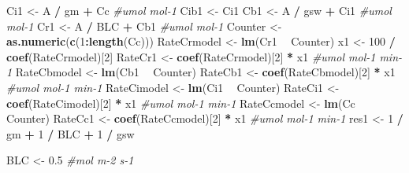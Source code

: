 \documentclass[
]{krantz}
\makeatletter
\newenvironment{Shaded}{\begin{snugshade}}{\end{snugshade}}
\newcommand{\CommentTok}[1]{\textcolor[rgb]{0.56,0.35,0.01}{\textit{#1}}}
\newcommand{\DecValTok}[1]{\textcolor[rgb]{0.00,0.00,0.81}{#1}}
\newcommand{\FloatTok}[1]{\textcolor[rgb]{0.00,0.00,0.81}{#1}}
\newcommand{\KeywordTok}[1]{\textcolor[rgb]{0.13,0.29,0.53}{\textbf{#1}}}
\newcommand{\NormalTok}[1]{#1}
\newcommand{\OperatorTok}[1]{\textcolor[rgb]{0.81,0.36,0.00}{\textbf{#1}}}
\newcommand{\StringTok}[1]{\textcolor[rgb]{0.31,0.60,0.02}{#1}}
\newenvironment{kframe}{%
\medskip{}
\setlength{\fboxsep}{.8em}
 \def\at@end@of@kframe{}%
 \ifinner\ifhmode%
  \def\at@end@of@kframe{\end{minipage}}%
  \begin{minipage}{\columnwidth}%
 \fi\fi%
 \def\FrameCommand##1{\hskip\@totalleftmargin \hskip-\fboxsep
 \colorbox{shadecolor}{##1}\hskip-\fboxsep
     \hskip-\linewidth \hskip-\@totalleftmargin \hskip\columnwidth}%
 \MakeFramed {\advance\hsize-\width
   \@totalleftmargin\z@ \linewidth\hsize
   \@setminipage}}%
 {\par\unskip\endMakeFramed%
 \at@end@of@kframe}
\renewenvironment{Shaded}{\begin{kframe}}{\end{kframe}}
\makeatother
\begin{document}
\begin{Shaded}
\begin{Highlighting}[]
\NormalTok{Ci1 <-}\StringTok{ }\NormalTok{A }\OperatorTok{/}\StringTok{ }\NormalTok{gm }\OperatorTok{+}\StringTok{ }\NormalTok{Cc }\CommentTok{#umol mol-1}
\NormalTok{Cib1 <-}\StringTok{ }\NormalTok{Ci1}
\NormalTok{Cb1 <-}\StringTok{ }\NormalTok{A }\OperatorTok{/}\StringTok{ }\NormalTok{gsw }\OperatorTok{+}\StringTok{ }\NormalTok{Ci1 }\CommentTok{#umol mol-1}
\NormalTok{Cr1 <-}\StringTok{ }\NormalTok{A }\OperatorTok{/}\StringTok{ }\NormalTok{BLC }\OperatorTok{+}\StringTok{ }\NormalTok{Cb1 }\CommentTok{#umol mol-1}
\NormalTok{Counter <-}\StringTok{ }\KeywordTok{as.numeric}\NormalTok{(}\KeywordTok{c}\NormalTok{(}\DecValTok{1}\OperatorTok{:}\KeywordTok{length}\NormalTok{(Cc)))}
\NormalTok{RateCrmodel <-}\StringTok{ }\KeywordTok{lm}\NormalTok{(Cr1 }\OperatorTok{~}\StringTok{ }\NormalTok{Counter)}
\NormalTok{x1 <-}\StringTok{ }\DecValTok{100} \OperatorTok{/}\StringTok{ }\KeywordTok{coef}\NormalTok{(RateCrmodel)[}\DecValTok{2}\NormalTok{]}
\NormalTok{RateCr1 <-}\StringTok{ }\KeywordTok{coef}\NormalTok{(RateCrmodel)[}\DecValTok{2}\NormalTok{] }\OperatorTok{*}\StringTok{ }\NormalTok{x1 }\CommentTok{#umol mol-1 min-1}
\NormalTok{RateCbmodel <-}\StringTok{ }\KeywordTok{lm}\NormalTok{(Cb1 }\OperatorTok{~}\StringTok{ }\NormalTok{Counter)}
\NormalTok{RateCb1 <-}\StringTok{ }\KeywordTok{coef}\NormalTok{(RateCbmodel)[}\DecValTok{2}\NormalTok{] }\OperatorTok{*}\StringTok{ }\NormalTok{x1 }\CommentTok{#umol mol-1 min-1}
\NormalTok{RateCimodel <-}\StringTok{ }\KeywordTok{lm}\NormalTok{(Ci1 }\OperatorTok{~}\StringTok{ }\NormalTok{Counter)}
\NormalTok{RateCi1 <-}\StringTok{ }\KeywordTok{coef}\NormalTok{(RateCimodel)[}\DecValTok{2}\NormalTok{] }\OperatorTok{*}\StringTok{ }\NormalTok{x1 }\CommentTok{#umol mol-1 min-1}
\NormalTok{RateCcmodel <-}\StringTok{ }\KeywordTok{lm}\NormalTok{(Cc }\OperatorTok{~}\StringTok{ }\NormalTok{Counter)}
\NormalTok{RateCc1 <-}\StringTok{ }\KeywordTok{coef}\NormalTok{(RateCcmodel)[}\DecValTok{2}\NormalTok{] }\OperatorTok{*}\StringTok{ }\NormalTok{x1 }\CommentTok{#umol mol-1 min-1}
\NormalTok{res1 <-}\StringTok{ }\DecValTok{1} \OperatorTok{/}\StringTok{ }\NormalTok{gm }\OperatorTok{+}\StringTok{ }\DecValTok{1} \OperatorTok{/}\StringTok{ }\NormalTok{BLC }\OperatorTok{+}\StringTok{ }\DecValTok{1} \OperatorTok{/}\StringTok{ }\NormalTok{gsw}

\NormalTok{BLC <-}\StringTok{ }\FloatTok{0.5} \CommentTok{#mol m-2 s-1}


\end{Highlighting}
\end{Shaded}
\end{document}
